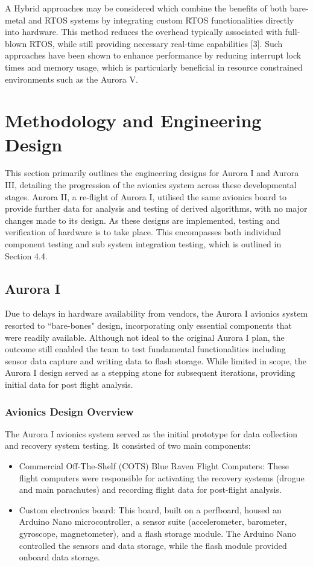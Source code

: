 A Hybrid approaches may be considered which combine the benefits of both bare-metal and RTOS systems by integrating custom RTOS functionalities directly into hardware. This method reduces the overhead typically associated with full-blown RTOS, while still providing necessary real-time capabilities [3]. Such approaches have been shown to enhance performance by reducing interrupt lock times and memory usage, which is particularly beneficial in resource constrained environments such as the Aurora V.  

\section{Methodology and Engineering Design}
This section primarily outlines the engineering designs for Aurora I and Aurora III, detailing the progression of the avionics system across these developmental stages. Aurora II, a re-flight of Aurora I, utilised the same avionics board to provide further data for analysis and testing of derived algorithms, with no major changes made to its design. As these designs are implemented, testing and verification of hardware is to take place. This encompasses both individual component testing and sub system integration testing, which is outlined in Section 4.4. 

\subsection{Aurora I }
Due to delays in hardware availability from vendors, the Aurora I avionics system resorted to “bare-bones" design, incorporating only essential components that were readily available. Although not ideal to the original Aurora I plan, the outcome still enabled the team to test fundamental functionalities including sensor data capture and writing data to flash storage. While limited in scope, the Aurora I design served as a stepping stone for subsequent iterations, providing initial data for post flight analysis. 

\subsubsection{Avionics Design Overview}
The Aurora I avionics system served as the initial prototype for data collection and recovery system testing. It consisted of two main components: 
\begin{itemize}
  \item Commercial Off-The-Shelf (COTS) Blue Raven Flight Computers: These flight computers were responsible for activating the recovery systems (drogue and main parachutes) and recording flight data for post-flight analysis. 
  \item Custom electronics board: This board, built on a perfboard, housed an Arduino Nano microcontroller, a sensor suite (accelerometer, barometer, gyroscope, magnetometer), and a flash storage module. The Arduino Nano controlled the sensors and data storage, while the flash module provided onboard data storage. 
\end{itemize}

